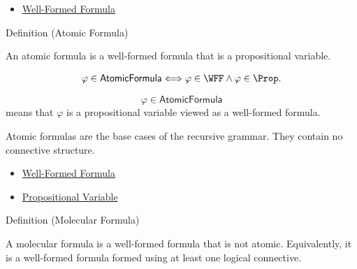 \begin{dependencies}
\begin{itemize}
  \item \hyperref[def:well-formed-formula]{Well-Formed Formula}
\end{itemize}
\end{dependencies}
\begin{definitionbox}{Definition (Atomic Formula)}
\begin{definition}
\label{def:atomic-formula-propositional-logic}
An atomic formula is a well-formed formula that is a propositional variable.
\end{definition}
\end{definitionbox}

\begin{remark*}
\[
\varphi\in\mathsf{AtomicFormula}
\Longleftrightarrow
\varphi\in\WFF\land\varphi\in\Prop.
\]
\end{remark*}

\begin{remark*}
\[
  \varphi\in\mathsf{AtomicFormula}
\] means that \(\varphi\) is a propositional variable viewed as a well-formed formula.
\end{remark*}

\begin{remark*}[Interpretation]
Atomic formulas are the base cases of the recursive grammar. They contain no connective structure.
\end{remark*}

\begin{dependencies}
\begin{itemize}
  \item \hyperref[def:well-formed-formula]{Well-Formed Formula}
  \item \hyperref[def:propositional-variable]{Propositional Variable}
\end{itemize}
\end{dependencies}
\begin{definitionbox}{Definition (Molecular Formula)}
\begin{definition}
\label{def:molecular-formula-propositional-logic}
A molecular formula is a well-formed formula that is not atomic. Equivalently, it is a well-formed formula formed using at least one logical connective.
\end{definition}
\end{definitionbox}

